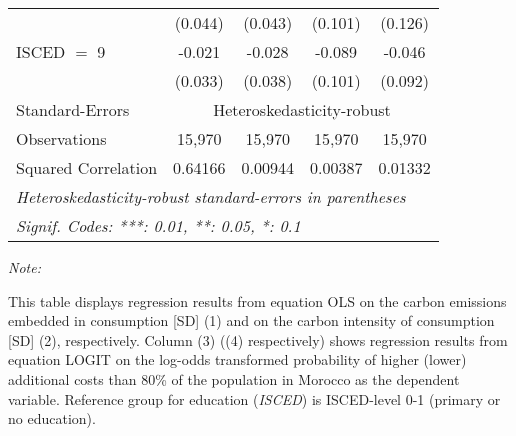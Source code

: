 \begin{table}[htbp!]
\begin{adjustbox}{width = 1\textwidth, max height = 0.95\textheight, center}
\begin{threeparttable}[b]
\begin{tabular}{lcccc}
                                 & (0.044)            & (0.043)            & (0.101)        & (0.126)\\   
            ISCED $=$ 9          & -0.021             & -0.028             & -0.089         & -0.046\\   
                                 & (0.033)            & (0.038)            & (0.101)        & (0.092)\\   
            \midrule 
            Standard-Errors & \multicolumn{4}{c}{Heteroskedasticity-robust} \\ 
            Observations         & 15,970             & 15,970             & 15,970         & 15,970\\  
            Squared Correlation  & 0.64166            & 0.00944            & 0.00387        & 0.01332\\  
            \midrule \midrule
            \multicolumn{5}{l}{\emph{Heteroskedasticity-robust standard-errors in parentheses}}\\
            \multicolumn{5}{l}{\emph{Signif. Codes: ***: 0.01, **: 0.05, *: 0.1}}\\
         \end{tabular}
         
         \begin{tablenotes}\item \medskip \textit{Note:}
            \item This table displays regression results from equation OLS on the carbon emissions embedded in consumption [SD] (1) and on the carbon intensity of consumption [SD] (2), respectively. 
                                      Column (3) ((4) respectively) shows regression results from equation LOGIT on the log-odds transformed probability of higher (lower) additional costs than 80\% of the population in Morocco as the dependent variable. Reference group for education (\textit{ISCED}) is ISCED-level 0-1 (primary or no education).
         \end{tablenotes}
      \end{threeparttable}
   \end{adjustbox}
\end{table}


